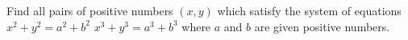 Find all pairs of positive numbers $(x,y)$ which satisfy the system of equations
$x^2 +y^2 = a^2 +b^2$
$x^3 +y^3 = a^3 +b^3$
where $a$ and $b$ are given positive numbers.